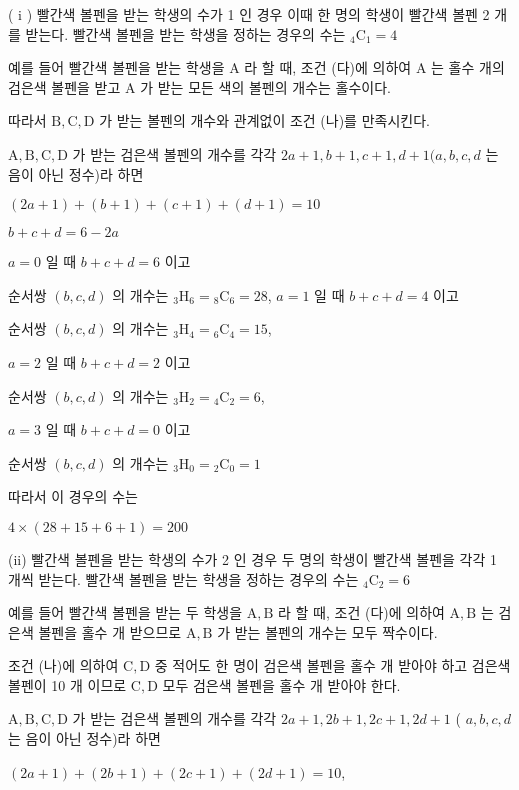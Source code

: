 \documentclass[10pt]{article}
\begin{document}
( i ) 빨간색 볼펜을 받는 학생의 수가 1 인 경우 이때 한 명의 학생이 빨간색 볼펜 2 개를 받는다. 빨간색 볼펜을 받는 학생을 정하는 경우의 수는 ${ }_{4} \mathrm{C}_{1}=4$

예를 들어 빨간색 볼펜을 받는 학생을 A 라 할 때, 조건 (다)에 의하여 A 는 홀수 개의 검은색 볼펜을 받고 A 가 받는 모든 색의 볼펜의 개수는 홀수이다.

따라서 $\mathrm{B}, \mathrm{C}, \mathrm{D}$ 가 받는 볼펜의 개수와 관계없이 조건 (나)를 만족시킨다.

$\mathrm{A}, \mathrm{B}, \mathrm{C}, \mathrm{D}$ 가 받는 검은색 볼펜의 개수를 각각 $2 a+1, b+1, c+1, d+1(a, b, c, d$ 는 음이 아닌 정수)라 하면

$(2 a+1)+(b+1)+(c+1)+(d+1)=10$

$b+c+d=6-2 a$

$a=0$ 일 때 $b+c+d=6$ 이고

순서쌍 $(b, c, d)$ 의 개수는 ${ }_{3} \mathrm{H}_{6}={ }_{8} \mathrm{C}_{6}=28$, $a=1$ 일 때 $b+c+d=4$ 이고

순서쌍 $(b, c, d)$ 의 개수는 ${ }_{3} \mathrm{H}_{4}={ }_{6} \mathrm{C}_{4}=15$,

$a=2$ 일 때 $b+c+d=2$ 이고

순서쌍 $(b, c, d)$ 의 개수는 ${ }_{3} \mathrm{H}_{2}={ }_{4} \mathrm{C}_{2}=6$,

$a=3$ 일 때 $b+c+d=0$ 이고

순서쌍 $(b, c, d)$ 의 개수는 ${ }_{3} \mathrm{H}_{0}={ }_{2} \mathrm{C}_{0}=1$

따라서 이 경우의 수는

$4 \times(28+15+6+1)=200$

(ii) 빨간색 볼펜을 받는 학생의 수가 2 인 경우 두 명의 학생이 빨간색 볼펜을 각각 1 개씩 받는다. 빨간색 볼펜을 받는 학생을 정하는 경우의 수는 ${ }_{4} \mathrm{C}_{2}=6$

예를 들어 빨간색 볼펜을 받는 두 학생을 $\mathrm{A}, \mathrm{B}$ 라 할 때, 조건 (다)에 의하여 $\mathrm{A}, \mathrm{B}$ 는 검은색 볼펜을 홀수 개 받으므로 $\mathrm{A}, \mathrm{B}$ 가 받는 볼펜의 개수는 모두 짝수이다.

조건 (나)에 의하여 $\mathrm{C}, \mathrm{D}$ 중 적어도 한 명이 검은색 볼펜을 홀수 개 받아야 하고 검은색 볼펜이 10 개 이므로 $\mathrm{C}, \mathrm{D}$ 모두 검은색 볼펜을 홀수 개 받아야 한다.

$\mathrm{A}, \mathrm{B}, \mathrm{C}, \mathrm{D}$ 가 받는 검은색 볼펜의 개수를 각각 $2 a+1,2 b+1,2 c+1,2 d+1$ ( $a, b, c, d$ 는 음이 아닌 정수)라 하면

$(2 a+1)+(2 b+1)+(2 c+1)+(2 d+1)=10$,
\end{document}
